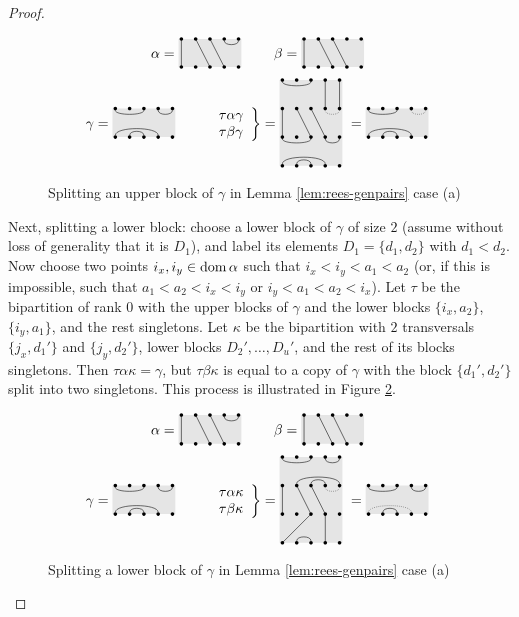 \begin{lemma}
\begin{proof}
    \begin{figure}[ht]
      \centering
      $$
      \alpha = \bipartdiag{\tv11 \tv23 \tv34 \tc45} \qquad
      \beta = \bipartdiag{\tv11 \tv23 \tv34}
      $$
      $$
      \gamma = \bipartdiag{\tc13 \tc45 \bC14 \bc23} \qquad
      \left.
        \begin{array}{l}\tau\alpha\gamma\\ \tau\beta\gamma \end{array}
      \right\} = \triplebipartdiag{
        \uutc13 \uutv44 \uutv55
        \utv11 \utv23 \utv34
        \draw[densely dotted](5, 3.875) .. controls (5, 3.5) and (4, 3.5) .. (4, 3.875);
        \tc13 \tc45 \bC14 \bc23
      } = \bipartdiag{\tc13 \bC14 \bc23
        \draw[densely dotted](4, 1.875) .. controls (4, 1.5) and (5, 1.5) .. (5, 1.875);
      }
      $$
      \caption{Splitting an upper block of $\gamma$ in Lemma
        \ref{lem:rees-genpairs} case (a)}
      \label{fig:case-a-r0-example-upper}
    \end{figure}

    Next, splitting a lower block: choose a lower block of $\gamma$ of size $2$
    (assume without loss of generality that it is $D_1$), and label its elements
    $D_1 = \{d_1, d_2\}$ with $d_1 < d_2$.  Now choose two points
    $i_x, i_y \in \operatorname{dom}\alpha$ such that $i_x < i_y < a_1 < a_2$ (or, if this is
    impossible, such that $a_1 < a_2 < i_x < i_y$ or $i_y < a_1 < a_2 < i_x$).
    Let $\tau$ be the bipartition of rank $0$ with the upper blocks of $\gamma$
    and the lower blocks $\{i_x, a_2\}$, $\{i_y, a_1\}$, and the rest
    singletons.  Let $\kappa$ be the bipartition with $2$ transversals
    $\{j_x, d_1'\}$ and $\{j_y, d_2'\}$, lower blocks $D_2', \ldots, D_u'$, and
    the rest of its blocks singletons.  Then $\tau\alpha\kappa = \gamma$, but
    $\tau\beta\kappa$ is equal to a copy of $\gamma$ with the block
    $\{d_1', d_2'\}$ split into two singletons.  This process is illustrated in
    Figure \ref{fig:case-a-r0-example-lower}.

    \begin{figure}[ht]
      \centering
      $$
      \alpha = \bipartdiag{\tv11 \tv23 \tv34 \tc45} \qquad
      \beta = \bipartdiag{\tv11 \tv23 \tv34}
      $$
      $$
      \gamma = \bipartdiag{\tc13 \tc45 \bC14 \bc23} \qquad
      \left.
        \begin{array}{l}\tau\alpha\kappa\\ \tau\beta\kappa \end{array}
      \right\} = \triplebipartdiag{
        \uutc13 \uutc45 \uubC25 \uubc34
        \utv11 \utv23 \utv34
        \draw[densely dotted](5, 3.875)
        .. controls (5, 3.5) and (4, 3.5)
        .. (4, 3.875);
        \tv31 \bc23 \tv44
      } = \bipartdiag{\tc13 \tc45 \bc23
        \draw[densely dotted](1, 0.125)
        .. controls (1, 0.75) and (4, 0.75)
        .. (4, 0.125);
      }
      $$
      \caption{Splitting a lower block of $\gamma$ in Lemma
        \ref{lem:rees-genpairs} case (a)}
      \label{fig:case-a-r0-example-lower}
    \end{figure}


\end{proof}
\end{lemma}
